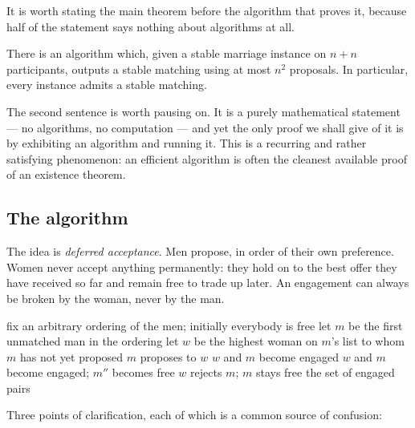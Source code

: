 It is worth stating the main theorem before the algorithm that proves it,
because half of the statement says nothing about algorithms at all.

\begin{theorem}\label{thm:sm-main}
There is an algorithm which, given a stable marriage instance on $n{+}n$
participants, outputs a stable matching using at most $n^2$ proposals. In
particular, every instance admits a stable matching.
\end{theorem}

The second sentence is worth pausing on. It is a purely mathematical
statement --- no algorithms, no computation --- and yet the only proof we
shall give of it is by exhibiting an algorithm and running it. This is a
recurring and rather satisfying phenomenon: an efficient algorithm is often
the cleanest available proof of an existence theorem.

\subsection{The algorithm}

The idea is \emph{deferred acceptance}. Men propose, in order of their own
preference. Women never accept anything permanently: they hold on to the best
offer they have received so far and remain free to trade up later. An
engagement can always be broken by the woman, never by the man.

\begin{algorithm}[ht]
\caption{Gale--Shapley (men proposing)}
\label{alg:sm-gs}
\begin{algorithmic}[1]
  \State fix an arbitrary ordering of the men; initially everybody is free
    \State let $m$ be the first unmatched man in the ordering
    \State let $w$ be the highest woman on $m$'s list to whom $m$ has not
           yet proposed
    \State $m$ proposes to $w$
      \State $w$ and $m$ become engaged
      \State $w$ and $m$ become engaged; $m''$ becomes free
    \Else
      \State $w$ rejects $m$; $m$ stays free
    \EndIf
  \EndWhile
  \State \Return the set of engaged pairs
\end{algorithmic}
\end{algorithm}

Three points of clarification, each of which is a common source of confusion:

